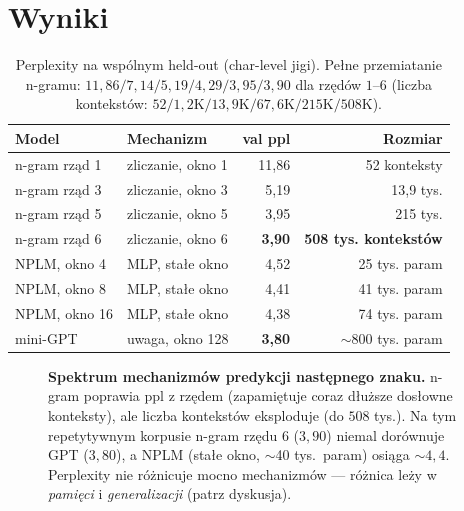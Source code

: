 \documentclass[11pt]{article}
\begin{document}
\section{Wyniki}
\begin{table}[h]
\centering
\begin{tabular}{llrr}
\toprule
Model & Mechanizm & val ppl & Rozmiar \\
\midrule
n-gram rząd 1 & zliczanie, okno 1            & 11{,}86 & 52 konteksty \\
n-gram rząd 3 & zliczanie, okno 3            & 5{,}19  & 13{,}9 tys. \\
n-gram rząd 5 & zliczanie, okno 5            & 3{,}95  & 215 tys. \\
n-gram rząd 6 & zliczanie, okno 6            & \textbf{3{,}90}  & \textbf{508 tys. kontekstów} \\
\midrule
NPLM, okno 4  & MLP, stałe okno             & 4{,}52  & 25 tys. param \\
NPLM, okno 8  & MLP, stałe okno             & 4{,}41  & 41 tys. param \\
NPLM, okno 16 & MLP, stałe okno             & 4{,}38  & 74 tys. param \\
\midrule
mini-GPT      & uwaga, okno 128             & \textbf{3{,}80}  & $\sim$800 tys. param \\
\bottomrule
\end{tabular}
\caption{Perplexity na wspólnym held-out (char-level jigi). Pełne przemiatanie n-gramu: $11{,}86 / 7{,}14 /
5{,}19 / 4{,}29 / 3{,}95 / 3{,}90$ dla rzędów $1$--$6$ (liczba kontekstów: $52 / 1{,}2\text{K} / 13{,}9\text{K} /
67{,}6\text{K} / 215\text{K} / 508\text{K}$).}
\end{table}

\begin{figure}[h]
\centering
{}
\caption{\textbf{Spektrum mechanizmów predykcji następnego znaku.} n-gram poprawia ppl z rzędem (zapamiętuje
coraz dłuższe dosłowne konteksty), ale liczba kontekstów eksploduje (do $508$ tys.). Na tym repetytywnym
korpusie n-gram rzędu 6 ($3{,}90$) niemal dorównuje GPT ($3{,}80$), a NPLM (stałe okno, $\sim$40 tys.\ param)
osiąga $\sim$$4{,}4$. Perplexity nie różnicuje mocno mechanizmów --- różnica leży w \emph{pamięci} i
\emph{generalizacji} (patrz dyskusja).}
\label{fig:spectrum}
\end{figure}
\end{document}
